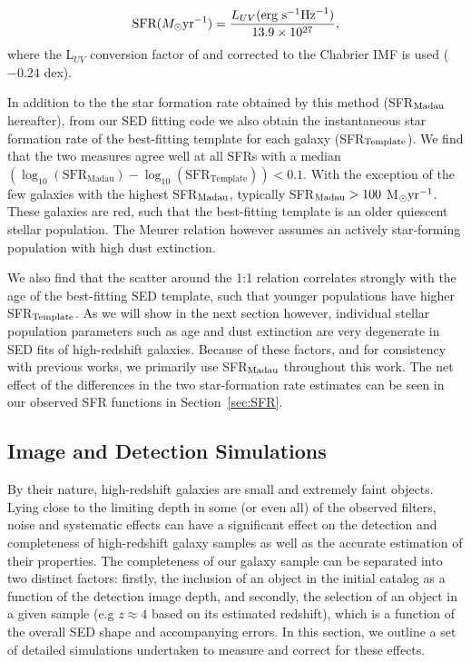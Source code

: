 \begin{equation}\label{eq:sfr}
  \textup{SFR} (M_{\odot} \textup{yr}^{-1}) = 
    \frac{L_{UV} (\textup{erg s}^{-1} \textup{Hz}^{-1})} {13.9 \times 10^{27}} ,
\end{equation}
where the L$_{UV}$ conversion factor of \citet{Madau:1998jd} and \citet{KennicuttJr:1998id} corrected to the Chabrier IMF is used ($-0.24$ dex).

In addition to the the star formation rate obtained by this method (SFR$_{\rm{Madau}}$ hereafter), from our SED fitting code we also obtain the instantaneous star formation rate of the best-fitting template for each galaxy (SFR$_{\rm{Template}}$). We find that the two measures agree well at all SFRs with a median$(\log_{10}(\text{SFR}_{\text{Madau}}) - \log_{10}(\text{SFR}_{\text{Template}})) < 0.1$. With the exception of the few galaxies with the highest SFR$_{\rm{Madau}}$, typically SFR$_{\rm{Madau}} > 100$ M$_{\odot} \textup{yr}^{-1}$. These galaxies are red, such that the best-fitting template is an older quiescent stellar population. The Meurer relation however assumes an actively star-forming population with high dust extinction.

We also find that the scatter around the 1:1 relation correlates strongly with the age of the best-fitting SED template, such that younger populations have higher SFR$_{\rm{Template}}$. As we will show in the next section however, individual stellar population parameters such as age and dust extinction are very degenerate in SED fits of high-redshift galaxies. Because of these factors, and for consistency with previous works, we primarily use SFR$_{\rm{Madau}}$ throughout this work. The net effect of the differences in the two star-formation rate estimates can be seen in our observed SFR functions in Section~\ref{sec:SFR}.

\subsection{Image and Detection Simulations}\label{sec:simulations}
By their nature, high-redshift galaxies are small and extremely faint objects. Lying close to the limiting depth in some (or even all) of the observed filters, noise and systematic effects can have a significant effect on the detection and completeness of high-redshift galaxy samples as well as the accurate estimation of their properties. The completeness of our galaxy sample can be separated into two distinct factors: firstly, the inclusion of an object in the initial catalog as a function of the detection image depth, and secondly, the selection of an object in a given sample (e.g $z\approx4$ based on its estimated redshift), which is a function of the overall SED shape and accompanying errors. In this section, we outline a set of detailed simulations undertaken to measure and correct for these effects.

